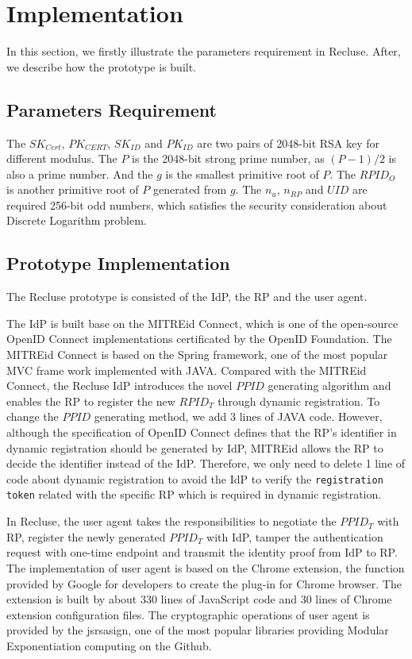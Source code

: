 \section{Implementation}
\label{sec:implementation}
In this section, we firstly illustrate the parameters requirement in Recluse. After, we describe how the prototype is built.

\subsection{Parameters Requirement}
The $SK_{Cert}$, $PK_{CERT}$, $SK_{ID}$ and $PK_{ID}$ are two pairs of 2048-bit RSA key for different modulus. The $P$ is the 2048-bit strong prime number, as $(P-1)/2$ is also a prime number. And the $g$ is the smallest primitive root of $P$. The $RPID_O$ is another primitive root of $P$ generated from $g$. The $n_u$, $n_{RP}$ and $UID$ are required 256-bit odd numbers, which satisfies the security consideration about Discrete Logarithm problem.

\subsection{Prototype Implementation}
The Recluse prototype is consisted of the IdP, the RP and the user agent.

The IdP is built base on the MITREid Connect, which is one of the open-source OpenID Connect implementations certificated by  the OpenID Foundation. The MITREid Connect is based on the Spring framework, one of the most popular MVC frame work implemented with JAVA. Compared with the MITREid Connect, the Recluse IdP introduces the novel $PPID$ generating algorithm and enables the RP to register the new $RPID_T$ through dynamic registration. To change the $PPID$ generating method, we add 3 lines of JAVA code. However, although the specification of OpenID Connect defines that the RP's identifier in dynamic registration should be generated by IdP, MITREid allows the RP to decide the identifier instead of the IdP. Therefore, we only need to delete 1 line of code about dynamic registration to avoid the IdP to verify the \verb+registration token+ related with the specific RP which is required in dynamic registration.

In Recluse, the user agent takes the responsibilities to negotiate the $PPID_T$ with RP, register the newly generated $PPID_T$ with IdP, tamper the authentication request with one-time endpoint and transmit the identity proof from IdP to RP. The implementation of user agent is based on the Chrome extension, the function provided by Google for developers to create the plug-in for Chrome browser. The extension is built by about 330 lines of JavaScript code and 30 lines of Chrome extension configuration files. The cryptographic operations of user agent is provided by the jsrsasign, one of the most popular libraries providing Modular Exponentiation computing on the Github.


